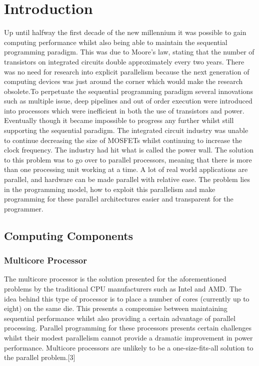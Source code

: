 \documentclass[../thesis.tex]{subfiles}
\begin{document}
\chapter{Introduction} 
Up until halfway the first decade of the new millennium it was possible to gain computing performance whilst also being able to maintain the sequential programming paradigm. This was due to Moore's law, stating that the number of transistors on integrated circuits double approximately every two years. There was no need for research into explicit parallelism because the next generation of computing devices was just around the corner which would make the research obsolete.To perpetuate the sequential programming paradigm several innovations such as multiple issue, deep pipelines and out of order execution were introduced into processors which were inefficient in both the use of transistors and power.  Eventually though it became impossible to progress any further whilst still supporting the sequential paradigm. The integrated circuit industry was unable to continue decreasing the size of MOSFETs whilst continuing to increase the clock frequency. The industry had hit what is called the power wall.
The solution to this problem was to go over to parallel processors, meaning that there is more than one processing unit working at a time. A lot of real world applications are parallel, and hardware can be made parallel with relative ease. The problem lies in the programming model, how to exploit this parallelism and make programming for these parallel architectures easier and transparent for the programmer.

\section{Computing Components}

\subsection{Multicore Processor}
The multicore processor is the solution presented for the aforementioned problems by the traditional CPU manufacturers such as Intel and AMD. The idea behind this type of processor is to place a number of cores (currently up to eight) on the same die. This presents a compromise between maintaining sequential performance whilst also providing a certain advantage of parallel processing. Parallel programming for these processors presents certain challenges whilst their modest parallelism cannot provide a dramatic improvement in power performance. Multicore processors are unlikely to be a one-size-fits-all solution to the parallel problem.[3]
\end{document}
